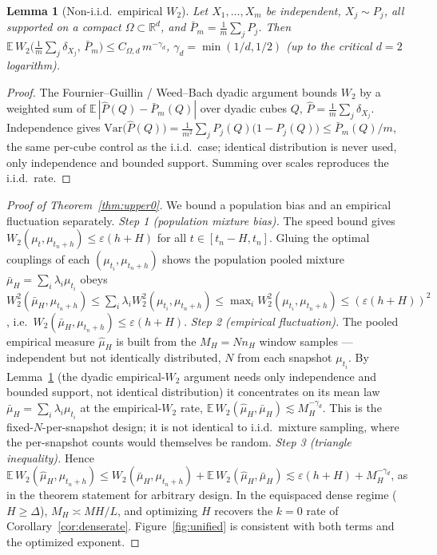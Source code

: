 \documentclass[11pt]{article}
\newtheorem{lemma}{Lemma}
\theoremstyle{definition}
\theoremstyle{remark}
\newcommand{\R}{\mathbb{R}}
\newcommand{\E}{\mathbb{E}}
\begin{document}
\begin{lemma}[Non-i.i.d.\ empirical $W_2$]\label{lem:pool}
Let $X_1,\dots,X_m$ be independent, $X_j\sim P_j$, all supported on a compact $\Omega\subset\R^d$, and
$\bar P_m=\tfrac1m\sum_j P_j$. Then
$\E\,W_2\big(\tfrac1m\sum_j\delta_{X_j},\,\bar P_m\big)\le C_{\Omega,d}\,m^{-\gamma_d}$,
$\gamma_d=\min(1/d,1/2)$ (up to the critical $d=2$ logarithm).
\end{lemma}
\begin{proof}
The Fournier--Guillin / Weed--Bach dyadic argument bounds $W_2$ by a weighted sum of
$\E\,|\hat P(Q)-\bar P_m(Q)|$ over dyadic cubes $Q$, $\hat P=\tfrac1m\sum_j\delta_{X_j}$. Independence
gives $\mathrm{Var}\big(\hat P(Q)\big)=\tfrac1{m^2}\sum_j P_j(Q)\big(1-P_j(Q)\big)\le \bar P_m(Q)/m$,
the same per-cube control as the i.i.d.\ case; identical distribution is never used, only independence
and bounded support. Summing over scales reproduces the i.i.d.\ rate.
\end{proof}

\begin{proof}[Proof of Theorem~\ref{thm:upper0}]
We bound a population bias and an empirical fluctuation separately.
\emph{Step 1 (population mixture bias).} The speed bound gives
$W_2(\mu_t,\mu_{t_n+h})\le\varepsilon(h+H)$ for all $t\in[t_n-H,t_n]$. Gluing the optimal couplings
of each $(\mu_{t_i},\mu_{t_n+h})$ shows the population pooled mixture
$\bar\mu_H=\sum_i\lambda_i\mu_{t_i}$ obeys
$W_2^2(\bar\mu_H,\mu_{t_n+h})\le\sum_i\lambda_i W_2^2(\mu_{t_i},\mu_{t_n+h})
\le\max_i W_2^2(\mu_{t_i},\mu_{t_n+h})\le(\varepsilon(h+H))^2$, i.e.\
$W_2(\bar\mu_H,\mu_{t_n+h})\le\varepsilon(h+H)$.
\emph{Step 2 (empirical fluctuation).} The pooled empirical measure $\hat\mu_H$ is built from the
$M_H=Nn_H$ window samples --- independent but not identically distributed, $N$ from each snapshot
$\mu_{t_i}$. By Lemma~\ref{lem:pool} (the dyadic empirical-$W_2$ argument needs only independence and
bounded support, not identical distribution) it concentrates on its mean law
$\bar\mu_H=\sum_i\lambda_i\mu_{t_i}$ at the empirical-$W_2$ rate,
$\E\,W_2(\hat\mu_H,\bar\mu_H)\lesssim M_H^{-\gamma_d}$. This is the fixed-$N$-per-snapshot design;
it is not identical to i.i.d.\ mixture sampling, where the per-snapshot counts would themselves be
random.
\emph{Step 3 (triangle inequality).} Hence
$\E\,W_2(\hat\mu_H,\mu_{t_n+h})\le W_2(\bar\mu_H,\mu_{t_n+h})+\E\,W_2(\hat\mu_H,\bar\mu_H)
\lesssim\varepsilon(h+H)+M_H^{-\gamma_d}$, as in the theorem statement for arbitrary design. In the
equispaced dense regime ($H\ge\Delta$), $M_H\asymp MH/L$, and optimizing $H$ recovers the $k=0$ rate
of Corollary~\ref{cor:denserate}.
Figure~\ref{fig:unified} is consistent with both terms and the optimized exponent.
\end{proof}
\end{document}
